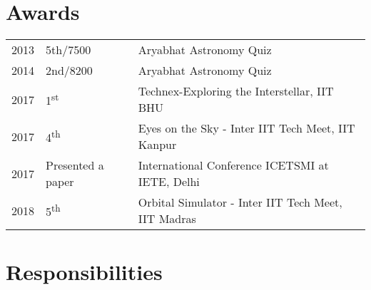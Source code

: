 \documentclass[]{deedy-resume-openfont}
\begin{document}
\begin{minipage}[t]{0.66\textwidth}
\section{Awards} 
\begin{tabular}{rll}
2013	     & 5th/7500  & Aryabhat Astronomy Quiz\\
2014	     & 2nd/8200  & Aryabhat Astronomy Quiz\\
2017	     & 1\textsuperscript{st}  & Technex-Exploring the Interstellar, IIT BHU\\
2017	     & 4\textsuperscript{th}  & Eyes on the Sky - Inter IIT Tech Meet, IIT Kanpur\\
2017     & Presented a paper & International Conference ICETSMI at IETE, Delhi  \\
2018     & 5\textsuperscript{th} & Orbital Simulator - Inter IIT Tech Meet, IIT Madras \\
\end{tabular}
\sectionsep


\section{Responsibilities} 
\sectionsep

\sectionsep

\sectionsep

\sectionsep

\end{minipage} 
\end{document}
